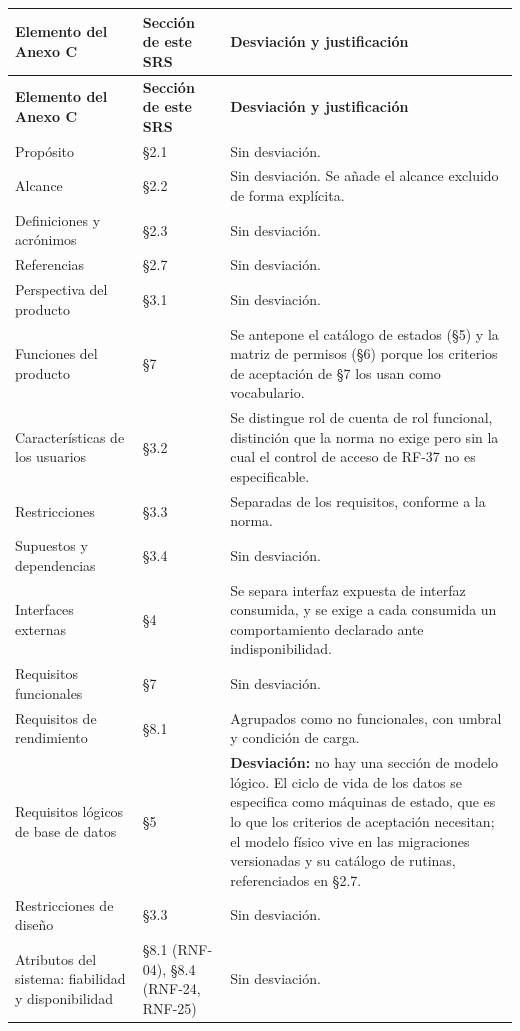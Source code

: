 \documentclass[11pt,a4paper]{article}
\begin{document}
\begin{longtable}{p{5.1cm} p{4.1cm} p{5.2cm}}
\toprule
\textbf{Elemento del Anexo C} & \textbf{Sección de este SRS} & \textbf{Desviación y
justificación} \\
\midrule
\endfirsthead
\toprule
\textbf{Elemento del Anexo C} & \textbf{Sección de este SRS} & \textbf{Desviación y
justificación} \\
\midrule
\endhead
Propósito & \S2.1 & Sin desviación. \\
Alcance & \S2.2 & Sin desviación. Se añade el alcance excluido de forma explícita. \\
Definiciones y acrónimos & \S2.3 & Sin desviación. \\
Referencias & \S2.7 & Sin desviación. \\
Perspectiva del producto & \S3.1 & Sin desviación. \\
Funciones del producto & \S7 & Se antepone el catálogo de estados (\S5) y la matriz de permisos
(\S6) porque los criterios de aceptación de \S7 los usan como vocabulario. \\
Características de los usuarios & \S3.2 & Se distingue rol de cuenta de rol funcional, distinción
que la norma no exige pero sin la cual el control de acceso de RF-37 no es especificable. \\
Restricciones & \S3.3 & Separadas de los requisitos, conforme a la norma. \\
Supuestos y dependencias & \S3.4 & Sin desviación. \\
Interfaces externas & \S4 & Se separa interfaz expuesta de interfaz consumida, y se exige a cada
consumida un comportamiento declarado ante indisponibilidad. \\
Requisitos funcionales & \S7 & Sin desviación. \\
Requisitos de rendimiento & \S8.1 & Agrupados como no funcionales, con umbral y condición de
carga. \\
Requisitos lógicos de base de datos & \S5 & \textbf{Desviación:} no hay una sección de modelo
lógico. El ciclo de vida de los datos se especifica como máquinas de estado, que es lo que los
criterios de aceptación necesitan; el modelo físico vive en las migraciones versionadas y su
catálogo de rutinas, referenciados en \S2.7. \\
Restricciones de diseño & \S3.3 & Sin desviación. \\
Atributos del sistema: fiabilidad y disponibilidad & \S8.1 (RNF-04), \S8.4 (RNF-24, RNF-25) &
Sin desviación. \\

\end{longtable}
\end{document}
